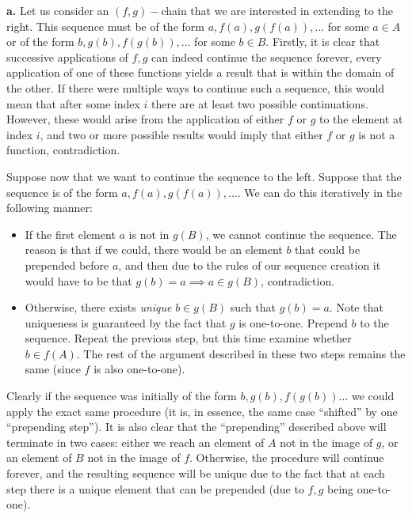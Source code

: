 \begin{solution}

    \textbf{a.} Let us consider an $(f, g)-$chain that we are interested in extending to the right. This sequence must be of the form $a, f(a), g(f(a)), \ldots$ for some $a \in A$ or of the form $b, g(b), f(g(b)), \ldots$ for some $b \in B$. Firstly, it is clear that successive applications of $f, g$ can indeed continue the sequence forever, every application of one of these functions yields a result that is within the domain of the other. If there were multiple ways to continue such a sequence, this would mean that after some index $i$ there are at least two possible continuations. However, these would arise from the application of either $f$ or $g$ to the element at index $i$, and two or more possible results would imply that either $f$ or $g$ is not a function, contradiction.

    Suppose now that we want to continue the sequence to the left. Suppose that the sequence is of the form $a, f(a), g(f(a)), \ldots$. We can do this iteratively in the following manner:
    \begin{itemize}
        \item If the first element $a$ is not in $g(B)$, we cannot continue the sequence. The reason is that if we could, there would be an element $b$ that could be prepended before $a$, and then due to the rules of our sequence creation it would have to be that $g(b) = a \implies a \in g(B)$, contradiction.
        \item Otherwise, there exists \textit{unique }$b \in g(B)$ such that $g(b) = a$. Note that uniqueness is guaranteed by the fact that $g$ is one-to-one. Prepend $b$ to the sequence. Repeat the previous step, but this time examine whether $b \in f(A)$. The rest of the argument described in these two steps remains the same (since $f$ is also one-to-one). 
    \end{itemize}

    Clearly if the sequence was initially of the form $b, g(b), f(g(b))\ldots$ we could apply the exact same procedure (it is, in essence, the same case ``shifted'' by one ``prepending step''). It is also clear that the ``prepending'' described above will terminate in two cases: either we reach an element of $A$ not in the image of $g$, or an element of $B$ not in the image of $f$. Otherwise, the procedure will continue forever, and the resulting sequence will be unique due to the fact that at each step there is a unique element that can be prepended (due to $f, g$ being one-to-one).


\end{solution}
